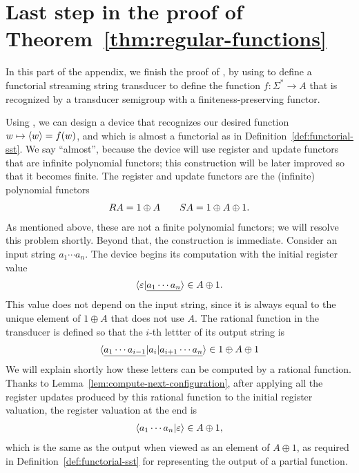 \section{Last step in the proof of Theorem~\ref{thm:regular-functions}}
In this part of the appendix, we finish the proof of , by using  to define a functorial streaming string transducer to define the function $f : \Sigma^* \to A$ that is recognized by a transducer semigroup with a finiteness-preserving functor. 

Using , we can design a device that  recognizes our desired function $w \mapsto \langle w \rangle=f(w)$, and which is almost a functorial \sst as in Definition~\ref{def:functorial-sst}. We say ``almost'', because the device will use register and update functors that are  infinite polynomial functors; this construction will be later improved so that it becomes finite.  The register and update functors are the (infinite) polynomial functors
\begin{align*}
\functorr A  = 1 \oplus A \qquad \functors A = 1 \oplus A \oplus 1.
\end{align*}
As mentioned above, these are  not a finite polynomial functors; we will resolve this problem shortly.  
Beyond that, the construction is immediate. Consider an input string 
$a_1 \cdots a_n$. The device begins its computation with the  initial register value 
\begin{align*}
    \langle \varepsilon | \underline{a_1 \cdots a_n} \rangle \in A \oplus 1.
\end{align*}
This value does not depend on the input string, since it is always equal to the unique element of $1 \oplus A$ that does not use $A$. The rational function  in the transducer is defined so that the $i$-th lettter of its output string is 
\begin{align*}
\langle \underline{a_1 \cdots a_{i-1}}|a_i| \underline{a_{i+1} \cdots a_n} \rangle \in 1 \oplus A \oplus 1
\end{align*}
We will explain shortly how these letters  can be computed by a rational function.
Thanks to Lemma~\ref{lem:compute-next-configuration}, after applying all the register updates produced by this rational function to the initial register valuation, the register valuation at the end is 
\begin{align*}
    \langle a_1 \cdots a_n | \varepsilon \rangle \in A \oplus 1,
\end{align*}
which is the same as the output when viewed as an element of $A \oplus 1$, as required in Definition~\ref{def:functorial-sst}  for representing the output of a partial function.

